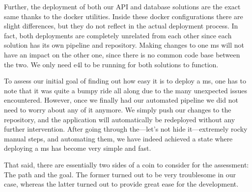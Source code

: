 Further, the deployment of both our API and database solutions are the
exact same thanks to the docker utilities. Inside these docker
configurations there are slight differences, but they do not reflect
in the actual deployment process. In fact, both deployments are
completely unrelated from each other since each solution has its
own pipeline and repository. Making changes to one \gls{ms} will not
have an impact on the other one, since there is no common code base
between the two. We only need \gls{e4l} to be running for both
solutions to function.


To assess our initial goal of finding out how easy it is to deploy a
\gls{ms}, one has to note that it was quite a bumpy ride all along due
to the many unexpected issues encountered. However,
once we finally had our automated pipeline we did not need to worry
about any of it anymore. We simply push our changes to the repository,
and the application will automatically be redeployed without any
further intervention. After going through the---let's not hide
it---extremely rocky manual steps, and
automating them, we have indeed achieved a state where deploying a
\gls{ms} has become very simple and fast.

That said, there are essentially two sides of a coin to consider for
the assessment: The path and the goal. The former turned out to be
very troublesome in our case, whereas the latter turned out to provide
great ease for the development.
